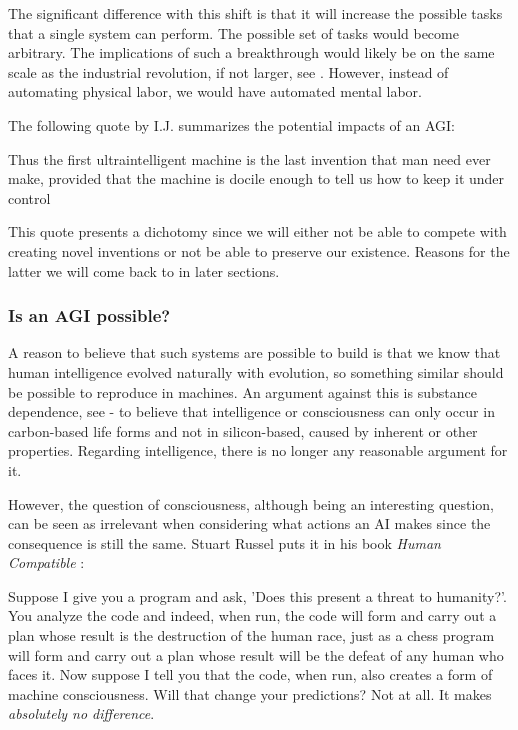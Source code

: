 \documentclass[12pt,A4]{report}
\newcommand{\autobaj}{}
\theoremstyle{definition}
\begin{document}
The significant difference with this shift is that it will increase the possible tasks that a single system can perform. The possible set of tasks would become arbitrary. The implications of such a breakthrough would likely be on the same scale as the industrial revolution, if not larger, see \citet{CritchKruger}. However, instead of automating physical labor, we would have automated mental labor. 

The following quote by I.J. \citet[p.33]{IJGood} summarizes the potential impacts of an AGI: 
\begin{displayquote}
Thus the first ultraintelligent machine is the last invention that man need ever make, provided that the machine is docile enough to tell us how to keep it under control
\end{displayquote}
This quote presents a dichotomy since we will either not be able to compete with creating novel inventions or not be able to preserve our existence. Reasons for the latter we will come back to in later sections. 

\subsubsection{Is an AGI possible?}
A reason to believe that such systems are possible to build is that we know that human intelligence evolved naturally with evolution, so something similar should be possible to reproduce in machines. %
An argument against this is substance dependence, see \citet{Bostrom03} - to believe that intelligence or consciousness can only occur in carbon-based life forms and not in silicon-based, caused by inherent or other properties. Regarding intelligence, there is no longer any reasonable argument for it. 

However, the question of consciousness, although being an interesting question, can be seen as irrelevant when considering what actions an AI makes since the consequence is still the same. Stuart Russel puts it in his book \textit{Human Compatible} \citet[p.22]{HumanCompatible}: 
\begin{displayquote}
  Suppose I give you a program and ask, 'Does this present a threat to humanity?'. You analyze the code and indeed, when run, the code will form and carry out a plan whose result is the destruction of the human race, just as a chess program will form and carry out a plan whose result will be the defeat of any human who faces it. Now suppose I tell you that the code, when run, also creates a form of machine consciousness. Will that change your predictions? Not at all. It makes \textit{absolutely no difference}.
\end{displayquote}
\end{document}
